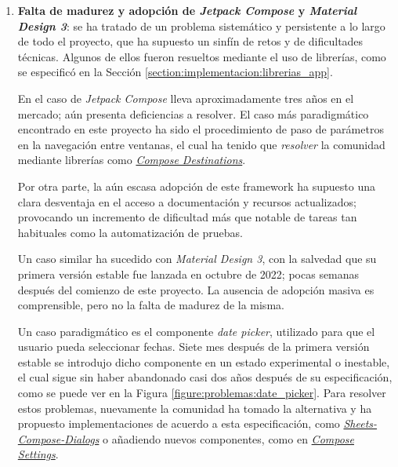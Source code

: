 \begin{enumerate}
        \item \textbf{Falta de madurez y adopción de \textit{Jetpack Compose} y \textit{Material Design 3}}: se ha tratado de un problema sistemático y persistente a lo largo de todo el proyecto, que ha supuesto un sinfín de retos y de dificultades técnicas. Algunos de ellos fueron resueltos mediante el uso de librerías, como se especificó en la Sección \ref{section:implementacion:librerias_app}.
    
        En el caso de \textit{Jetpack Compose} lleva aproximadamente tres años en el mercado; aún presenta deficiencias a resolver. El caso más paradigmático encontrado en este proyecto ha sido el procedimiento de paso de parámetros en la navegación entre ventanas, el cual ha tenido que \textit{resolver} la comunidad mediante librerías como \href{https://github.com/raamcosta/compose-destinations}{\textit{Compose Destinations}}.  
        
        Por otra parte, la aún escasa adopción de este \gls{framework} ha supuesto una clara desventaja en el acceso a documentación y recursos actualizados; provocando un incremento de dificultad más que notable de tareas tan habituales como la automatización de pruebas.
    
        Un caso similar ha sucedido con \textit{Material Design 3}, con la salvedad que su primera versión estable fue lanzada en octubre de 2022; pocas semanas después del comienzo de este proyecto. La ausencia de adopción masiva es comprensible, pero no la falta de madurez de la misma. 
        
        Un caso paradigmático es el componente \textit{date picker}, utilizado para que el usuario pueda seleccionar fechas. Siete mes después de la primera versión estable se introdujo dicho componente en un estado experimental o inestable, el cual sigue sin haber abandonado casi dos años después de su especificación, como se puede ver en la Figura \ref{figure:problemas:date_picker}. Para resolver estos problemas, nuevamente la comunidad ha tomado la alternativa y ha propuesto implementaciones de acuerdo a esta especificación, como \href{https://github.com/maxkeppeler/sheets-compose-dialogs}{\textit{Sheets-Compose-Dialogs}} o añadiendo nuevos componentes, como en \href{https://github.com/alorma/Compose-Settings}{\textit{Compose Settings}}.
    

\end{enumerate}
